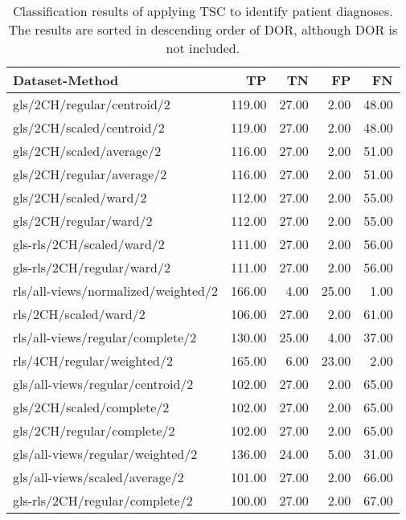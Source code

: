 \begin{longtable}{lrrrr}
    \caption{Classification results of applying TSC to identify patient diagnoses.
             The results are sorted in descending order of DOR, although DOR is not included.}
    \label{tab:tsc_ind_raw_results}\\
    \hline
    Dataset-Method                            &     TP &    TN &    FP &    FN \\
    \hline
    gls/2CH/regular/centroid/2                & 119.00 & 27.00 &  2.00 & 48.00 \\
    gls/2CH/scaled/centroid/2                 & 119.00 & 27.00 &  2.00 & 48.00 \\
    gls/2CH/scaled/average/2                  & 116.00 & 27.00 &  2.00 & 51.00 \\
    gls/2CH/regular/average/2                 & 116.00 & 27.00 &  2.00 & 51.00 \\
    gls/2CH/scaled/ward/2                     & 112.00 & 27.00 &  2.00 & 55.00 \\
    gls/2CH/regular/ward/2                    & 112.00 & 27.00 &  2.00 & 55.00 \\
    gls-rls/2CH/scaled/ward/2                 & 111.00 & 27.00 &  2.00 & 56.00 \\
    gls-rls/2CH/regular/ward/2                & 111.00 & 27.00 &  2.00 & 56.00 \\
    rls/all-views/normalized/weighted/2       & 166.00 &  4.00 & 25.00 &  1.00 \\
    rls/2CH/scaled/ward/2                     & 106.00 & 27.00 &  2.00 & 61.00 \\
    rls/all-views/regular/complete/2          & 130.00 & 25.00 &  4.00 & 37.00 \\
    rls/4CH/regular/weighted/2                & 165.00 &  6.00 & 23.00 &  2.00 \\
    gls/all-views/regular/centroid/2          & 102.00 & 27.00 &  2.00 & 65.00 \\
    gls/2CH/scaled/complete/2                 & 102.00 & 27.00 &  2.00 & 65.00 \\
    gls/2CH/regular/complete/2                & 102.00 & 27.00 &  2.00 & 65.00 \\
    gls/all-views/regular/weighted/2          & 136.00 & 24.00 &  5.00 & 31.00 \\
    gls/all-views/scaled/average/2            & 101.00 & 27.00 &  2.00 & 66.00 \\
    gls-rls/2CH/regular/complete/2            & 100.00 & 27.00 &  2.00 & 67.00 \\

\end{longtable}
